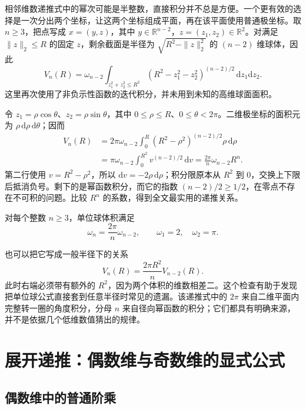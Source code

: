 \documentclass[UTF8,12pt,a4paper,fontset=fandol]{ctexart}
\begin{document}
相邻维数递推式中的幂次可能是半整数，直接积分并不总是方便。一个更有效的选择是一次分出两个坐标，让这两个坐标组成平面，再在该平面使用普通极坐标。取 $n\geq3$，把点写成 $x=(y,z)$，其中 $y\in\mathbb R^{n-2}$，$z=(z_1,z_2)\in\mathbb R^2$。对满足 $\|z\|_2\leq R$ 的固定 $z$，剩余截面是半径为 $\sqrt{R^2-\|z\|_2^2}$ 的 $(n-2)$ 维球体，因此
\[
  V_n(R)=\omega_{n-2}\int_{z_1^2+z_2^2\leq R^2}
  (R^2-z_1^2-z_2^2)^{(n-2)/2}\,\mathrm dz_1\mathrm dz_2.
\]
这里再次使用了非负示性函数的迭代积分，并未用到未知的高维球面面积。

令 $z_1=\rho\cos\theta$、$z_2=\rho\sin\theta$，其中 $0\leq\rho\leq R$、$0\leq\theta<2\pi$。二维极坐标的面积元为 $\rho\,\mathrm d\rho\,\mathrm d\theta$；因而
\begin{align*}
  V_n(R)
  &=2\pi\omega_{n-2}\int_0^R
    (R^2-\rho^2)^{(n-2)/2}\rho\,\mathrm d\rho\\
  &=\pi\omega_{n-2}\int_0^{R^2}v^{(n-2)/2}\,\mathrm dv
    =\frac{2\pi}{n}\omega_{n-2}R^n.
\end{align*}
第二行使用 $v=R^2-\rho^2$，所以 $\mathrm dv=-2\rho\,\mathrm d\rho$；积分限原本从 $R^2$ 到 $0$，交换上下限后抵消负号。剩下的是幂函数积分，而它的指数 $(n-2)/2\geq1/2$，在零点不存在不可积的问题。比较 $R^n$ 的系数，得到全文最实用的递推关系。

\begin{proposition}[隔两维的体积递推]\label{prop:nb-recurrence}
对每个整数 $n\geq3$，单位球体积满足
\begin{equation}\label{eq:nb-recurrence}
  \boxed{\omega_n=\frac{2\pi}{n}\omega_{n-2}},
  \qquad \omega_1=2,\quad\omega_2=\pi.
\end{equation}
\end{proposition}

也可以把它写成一般半径下的关系
\[
  V_n(R)=\frac{2\pi R^2}{n}V_{n-2}(R).
\]
此时右端必须带有额外的 $R^2$，因为两个体积的维数相差二。这个检查有助于发现把单位球公式直接套到任意半径时常见的遗漏。该递推式中的 $2\pi$ 来自二维平面内完整转一圈的角度积分，分母 $n$ 来自径向幂函数的积分；它们都具有明确来源，并不是依据几个低维数值猜出的规律。

\section{展开递推：偶数维与奇数维的显式公式}
\label{sec:nb-parity}

\subsection{偶数维中的普通阶乘}
\end{document}
